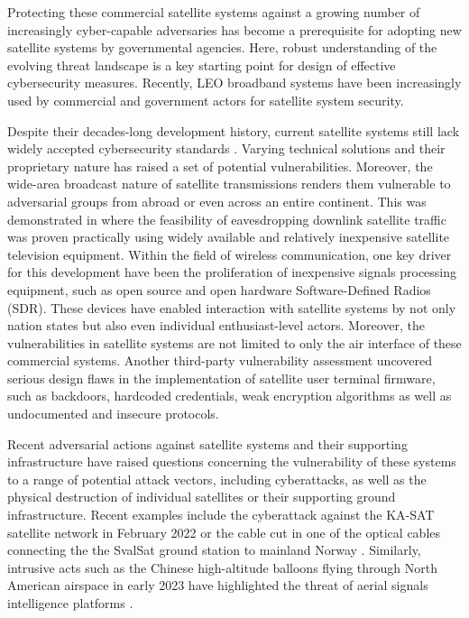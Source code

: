 \documentclass[english, 12pt, a4paper, elec, utf8, a-1b, online]{aaltothesis}
\begin{document}
Protecting these commercial satellite systems against a growing number of increasingly cyber-capable adversaries has become a prerequisite for adopting new satellite systems by governmental agencies.
Here, robust understanding of the evolving threat landscape is a key starting point for design of effective cybersecurity measures.
Recently, LEO broadband systems have been increasingly used by commercial and government actors for satellite system security.

Despite their decades-long development history,  current satellite systems still lack widely accepted cybersecurity standards \cite{lin2022defending}.
Varying technical solutions and their proprietary nature has raised a set of potential vulnerabilities.
Moreover, the wide-area broadcast nature of satellite transmissions renders them vulnerable to adversarial groups from abroad or even across an entire continent.
This was demonstrated in \cite{pavur2020tale} where the feasibility of eavesdropping downlink satellite traffic was proven practically using widely available and relatively inexpensive satellite television equipment.
Within the field of wireless communication, one key driver for this development have been the proliferation of inexpensive signals processing equipment, such as open source and open hardware Software-Defined Radios (SDR).
These devices have enabled interaction with satellite systems by not only nation states but also even individual enthusiast-level actors.
Moreover, the vulnerabilities in satellite systems are not limited to only the air interface of these commercial systems.
Another third-party vulnerability assessment \cite{santamarta2014wake} uncovered serious design flaws in the implementation of satellite user terminal firmware, such as backdoors, hardcoded credentials, weak encryption algorithms as well as undocumented and insecure protocols.

Recent adversarial actions against satellite systems and their supporting infrastructure have raised questions concerning the vulnerability of these systems to a range of potential attack vectors, including cyberattacks, as well as the physical destruction of individual satellites or their supporting ground infrastructure.
Recent examples include the cyberattack against the KA-SAT satellite network in February 2022 \cite{boschetti2022space} or the cable cut in one of the optical cables connecting the the SvalSat ground station to mainland Norway \cite{schia2023subsea}.
Similarly, intrusive acts such as the Chinese high-altitude balloons flying through North American airspace in early 2023 have highlighted the threat of aerial signals intelligence platforms \cite{wip}.
\end{document}
